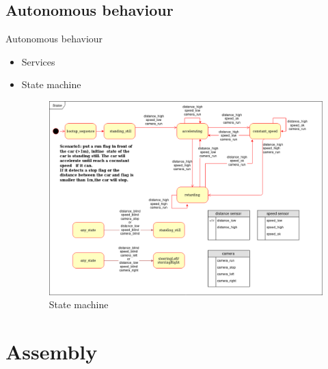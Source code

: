 \documentclass{beamer}
\begin{document}
\subsection{Autonomous behaviour}

\begin{frame}{Autonomous behaviour}
 \begin{itemize}
  \item Services
  \item State machine
  \begin{figure}
    \includegraphics[width=0.7\linewidth]{statemachine.png}
    \caption{State machine}
  \end{figure}
 \end{itemize}

\end{frame}


\section{Assembly}
\end{document}
